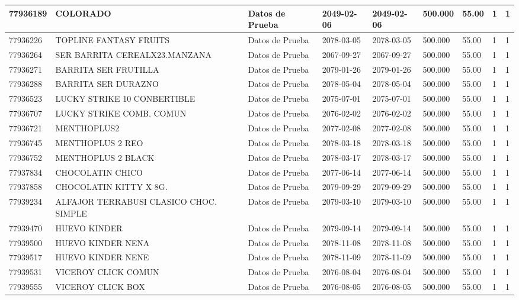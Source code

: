 \documentclass[a4paper,12pt]{article}
\begin{document}
\begin{landscape}
\begin{longtable}{|p{4cm}|p{2.5cm}|p{2.5cm}|p{1.8cm}|p{1.8cm}|p{1cm}|p{1cm}|p{3cm}|p{3cm}||}
77936189 & COLORADO & Datos de Prueba & 2049-02-06 & 2049-02-06 & 500.000 & 55.00 & 1 & 1 \\ \hline 
77936226 & TOPLINE FANTASY FRUITS & Datos de Prueba & 2078-03-05 & 2078-03-05 & 500.000 & 55.00 & 1 & 1 \\ \hline 
77936264 & SER BARRITA CEREALX23.MANZANA & Datos de Prueba & 2067-09-27 & 2067-09-27 & 500.000 & 55.00 & 1 & 1 \\ \hline 
77936271 & BARRITA SER FRUTILLA & Datos de Prueba & 2079-01-26 & 2079-01-26 & 500.000 & 55.00 & 1 & 1 \\ \hline 
77936288 & BARRITA SER DURAZNO & Datos de Prueba & 2078-05-04 & 2078-05-04 & 500.000 & 55.00 & 1 & 1 \\ \hline 
77936523 & LUCKY STRIKE  10 CONBERTIBLE & Datos de Prueba & 2075-07-01 & 2075-07-01 & 500.000 & 55.00 & 1 & 1 \\ \hline 
77936707 & LUCKY STRIKE COMB. COMUN & Datos de Prueba & 2076-02-02 & 2076-02-02 & 500.000 & 55.00 & 1 & 1 \\ \hline 
77936721 & MENTHOPLUS2 & Datos de Prueba & 2077-02-08 & 2077-02-08 & 500.000 & 55.00 & 1 & 1 \\ \hline 
77936745 & MENTHOPLUS 2 REO & Datos de Prueba & 2078-03-18 & 2078-03-18 & 500.000 & 55.00 & 1 & 1 \\ \hline 
77936752 & MENTHOPLUS 2 BLACK & Datos de Prueba & 2078-03-17 & 2078-03-17 & 500.000 & 55.00 & 1 & 1 \\ \hline 
77937834 & CHOCOLATIN CHICO & Datos de Prueba & 2077-06-14 & 2077-06-14 & 500.000 & 55.00 & 1 & 1 \\ \hline 
77937858 & CHOCOLATIN KITTY X 8G. & Datos de Prueba & 2079-09-29 & 2079-09-29 & 500.000 & 55.00 & 1 & 1 \\ \hline 
77939234 & ALFAJOR TERRABUSI CLASICO CHOC. SIMPLE & Datos de Prueba & 2079-03-10 & 2079-03-10 & 500.000 & 55.00 & 1 & 1 \\ \hline 
77939470 & HUEVO KINDER & Datos de Prueba & 2079-09-14 & 2079-09-14 & 500.000 & 55.00 & 1 & 1 \\ \hline 
77939500 & HUEVO KINDER NENA & Datos de Prueba & 2078-11-08 & 2078-11-08 & 500.000 & 55.00 & 1 & 1 \\ \hline 
77939517 & HUEVO KINDER NENE & Datos de Prueba & 2078-11-09 & 2078-11-09 & 500.000 & 55.00 & 1 & 1 \\ \hline 
77939531 & VICEROY CLICK COMUN & Datos de Prueba & 2076-08-04 & 2076-08-04 & 500.000 & 55.00 & 1 & 1 \\ \hline 
77939555 & VICEROY CLICK BOX & Datos de Prueba & 2076-08-05 & 2076-08-05 & 500.000 & 55.00 & 1 & 1 \\ \hline 

\end{longtable}
\end{landscape}
\end{document}
